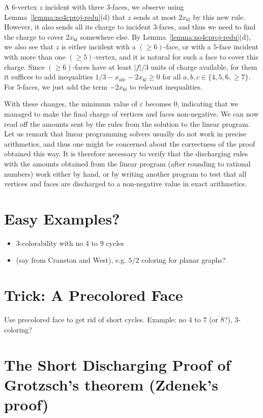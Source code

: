 \documentclass[12pt,twoside,openright,a4paper]{book}
\begin{document}
A $6$-vertex $z$ incident with three $3$-faces, we observe using Lemma~\ref{lemma:no4cproj-redu}(d) that
$z$ sends at most $2x_{6l}$ by this new rule.  However, it also sends all its charge to incident $3$-faces,
and thus we need to find the charge to cover $2x_{6l}$ somewhere else.  By Lemma~\ref{lemma:no4cproj-redu}(d),
we also see that $z$ is either incident with a $(\ge\!6)$-face, or with a $5$-face incident with more than one $(\ge\!5)$-vertex,
and it is natural for such a face to cover this charge.  Since $(\ge\!6)$-faces have at least $|f|/3$ units of charge available,
for them it suffices to add inequalities $1/3-x_{abc}-2x_{6l}\ge 0$ for all $a,b,c\in\{4,5,6,{\ge\!7}\}$.  For $5$-faces,
we just add the term $-2x_{6l}$ to relevant inequalities.

With these changes, the minimum value of $\varepsilon$ becomes $0$, indicating that we managed to make the final charge
of vertices and faces non-negative.  We can now read off the amounts sent by the rules from the solution to the linear program.
Let us remark that linear programming solvers usually do not work in precise arithmetics, and thus one might be concerned
about the correctness of the proof obtained this way.  It is therefore necessary to verify that the discharging rules with
the amounts obtained from the linear program (after rounding to rational numbers) work either by hand, or by writing another program
to test that all vertices and faces are discharged to a non-negative value in exact arithmetics.

\section{Easy Examples?}

\begin{itemize}
\item $3$-colorability with no 4 to 9 cycles
\item (say from Cranston and West), e.g. $5/2$ coloring for planar graphs?
\end{itemize}

\section{Trick: A Precolored Face}

Use precolored face to get rid of short cycles. Example: no $4$ to $7$ (or $8$?), $3$-coloring?
 
\section{The Short Discharging Proof of Grotzsch's theorem (Zdenek's proof)}
\end{document}
